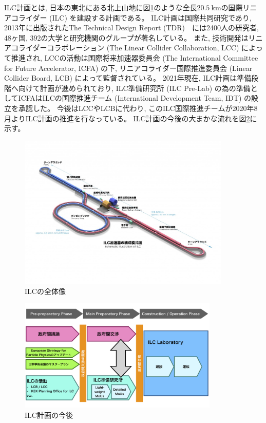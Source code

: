ILC計画とは, 日本の東北にある北上山地に図\ref{2InternationalLinearCollider}のような全長$20.5\ \mathrm{km}$の国際リニアコライダー (ILC) を建設する計画である。
ILC計画は国際共同研究であり, 2013年に出版されたThe Technical Design Report (TDR\cite{ILCTDRVES})　には2400人の研究者, 48ヶ国, 392の大学と研究機関のグループが著名している。
また, 技術開発はリニアコライダーコラボレーション (The Linear Collider Collaboration, LCC) によって推進され, LCCの活動は国際将来加速器委員会 (The International Committee for Future Accelerator, ICFA) の下, リニアコライダー国際推進委員会 (Linear Collider Board, LCB) によって監督されている。
2021年現在, ILC計画は準備段階へ向けて計画が進められており, ILC準備研究所 (ILC Pre-Lab) の為の準備としてICFAはILCの国際推進チーム (International Development Team, IDT) の設立を承認した。
今後はLCCやLCBに代わり, このILC国際推進チームが2020年8月よりILC計画の推進を行なっている。
ILC計画の今後の大まかな流れを図\ref{3ILCProject}に示す。

\begin{figure}[htbp]
 \centering
  \includegraphics[trim = 0 100 0 100, width=0.9\textwidth, clip]{Figure/1Introduction/2InternationalLinearCollider.jpg}
  \caption[ILCの全体像]
                 {ILCの全体像\cite{ILCPHOTO}}
  \label{2InternationalLinearCollider}
\end{figure}

\begin{figure}[htbp]
 \centering
 \includegraphics[width=0.85\textwidth]{Figure/1Introduction/3ILCProject.png}
 \caption[ILC計画の今後]
                {ILC計画の今後\cite{RecommendationsonILCProjectImplementation}}
 \label{3ILCProject}
\end{figure}


